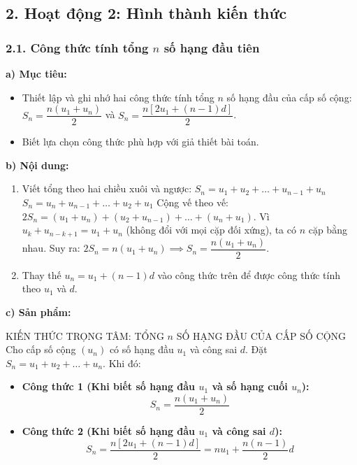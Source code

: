 \documentclass[12pt, a4paper]{article}
\begin{document}
\subsection*{2. Hoạt động 2: Hình thành kiến thức}  
  
\subsubsection*{2.1. Công thức tính tổng $n$ số hạng đầu tiên}  
  
\noindent \textbf{a) Mục tiêu:}  
\begin{itemize}[leftmargin=0.8cm]  
    \item Thiết lập và ghi nhớ hai công thức tính tổng $n$ số hạng đầu của cấp số cộng: $S_n = \dfrac{n(u_1 + u_n)}{2}$ và $S_n = \dfrac{n[2u_1 + (n - 1)d]}{2}$.  
    \item Biết lựa chọn công thức phù hợp với giả thiết bài toán.  
\end{itemize}  
  
\noindent \textbf{b) Nội dung:}  
\begin{enumerate}[leftmargin=0.6cm]  
    \item Viết tổng theo hai chiều xuôi và ngược:  
    $S_n = u_1 + u_2 + \dots + u_{n-1} + u_n$  
    $S_n = u_n + u_{n-1} + \dots + u_2 + u_1$  
    Cộng vế theo vế: $2S_n = (u_1 + u_n) + (u_2 + u_{n-1}) + \dots + (u_n + u_1)$.  
    Vì $u_k + u_{n-k+1} = u_1 + u_n$ (không đổi với mọi cặp đối xứng), ta có $n$ cặp bằng nhau.  
    Suy ra: $2S_n = n(u_1 + u_n) \implies S_n = \dfrac{n(u_1 + u_n)}{2}$.  
    \item Thay thế $u_n = u_1 + (n - 1)d$ vào công thức trên để được công thức tính theo $u_1$ và $d$.  
\end{enumerate}  
  
\noindent \textbf{c) Sản phẩm:}  
  
\begin{pedabox}{KIẾN THỨC TRỌNG TÂM: TỔNG $n$ SỐ HẠNG ĐẦU CỦA CẤP SỐ CỘNG}  
Cho cấp số cộng $(u_n)$ có số hạng đầu $u_1$ và công sai $d$.  
Đặt $S_n = u_1 + u_2 + \dots + u_n$. Khi đó:  
\begin{itemize}[leftmargin=0.6cm]  
    \item \textbf{Công thức 1 (Khi biết số hạng đầu $u_1$ và số hạng cuối $u_n$):}  
    $$S_n = \dfrac{n(u_1 + u_n)}{2}$$  
    \item \textbf{Công thức 2 (Khi biết số hạng đầu $u_1$ và công sai $d$):}  
    $$S_n = \dfrac{n[2u_1 + (n - 1)d]}{2} = n u_1 + \dfrac{n(n - 1)}{2}d$$  
\end{itemize}  
\end{pedabox}  
  
\end{document}
